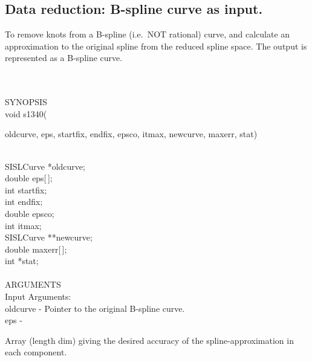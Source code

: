 \subsection{Data reduction: B-spline curve as input.}
\begin{minipg1}
  To remove knots from a B-spline (i.e.\ NOT rational) curve, and
  calculate an approximation to the original spline from the reduced
  spline space.
  The output is represented as a B-spline curve.
\end{minipg1} \\ \\
SYNOPSIS\\
        \>void s1340(\begin{minipg3}
                {\fov oldcurve}, {\fov eps}, {\fov startfix}, {\fov endfix}, {\fov epsco}, {\fov itmax},
                {\fov newcurve}, {\fov maxerr}, {\fov stat})
                \end{minipg3}\\[0.3ex]
                \>\>    SISLCurve       \>      *{\fov oldcurve};\\
                \>\>    double  \>      {\fov eps}[\,];\\
                \>\>    int     \>      {\fov startfix};\\
                \>\>    int     \>      {\fov endfix};\\
                \>\>    double  \>      {\fov epsco};\\
                \>\>    int     \>      {\fov itmax};\\
                \>\>    SISLCurve       \>      **{\fov newcurve};\\
                \>\>    double  \>      {\fov maxerr}[\,];\\
                \>\>    int     \>      *{\fov stat};\\
\\
ARGUMENTS\\
        \>Input Arguments:\\
        \>\>    {\fov oldcurve}\> - \>  Pointer to the original B-spline
                                        curve.\\
        \>\>    {\fov eps}      \> - \> \begin{minipg2}
                                Array (length dim) giving the desired accuracy of
                                the spline-approximation in each component.
                                \end{minipg2}\\[0.3ex]
